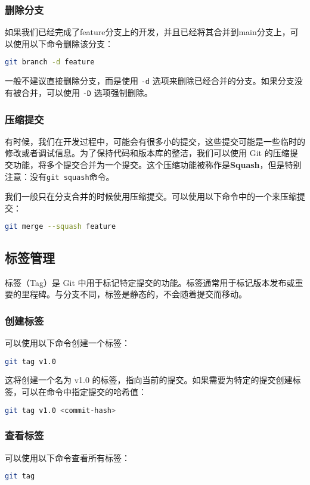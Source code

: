 \subsubsection{删除分支}

如果我们已经完成了feature分支上的开发，并且已经将其合并到main分支上，可以使用以下命令删除该分支：
\begin{lstlisting}[language=bash]
git branch -d feature
\end{lstlisting}

一般不建议直接删除分支，而是使用 \texttt{-d} 选项来删除已经合并的分支。如果分支没有被合并，可以使用 \texttt{-D} 选项强制删除。

\subsubsection{压缩提交}

有时候，我们在开发过程中，可能会有很多小的提交，这些提交可能是一些临时的修改或者调试信息。为了保持代码和版本库的整洁，我们可以使用 Git 的压缩提交功能，将多个提交合并为一个提交。这个压缩功能被称作是\textbf{Squash}，但是特别注意：没有\texttt{git squash}命令。

我们一般只在分支合并的时候使用压缩提交。可以使用以下命令中的一个来压缩提交：
\begin{lstlisting}[language=bash]
git merge --squash feature
\end{lstlisting}

\subsection{标签管理}
标签（Tag）是 Git 中用于标记特定提交的功能。标签通常用于标记版本发布或重要的里程碑。与分支不同，标签是静态的，不会随着提交而移动。

\subsubsection{创建标签}
可以使用以下命令创建一个标签：
\begin{lstlisting}[language=bash]
git tag v1.0
\end{lstlisting}

这将创建一个名为 v1.0 的标签，指向当前的提交。如果需要为特定的提交创建标签，可以在命令中指定提交的哈希值：
\begin{lstlisting}[language=bash]
git tag v1.0 <commit-hash>
\end{lstlisting}

\subsubsection{查看标签}
可以使用以下命令查看所有标签：
\begin{lstlisting}[language=bash]
git tag
\end{lstlisting}

